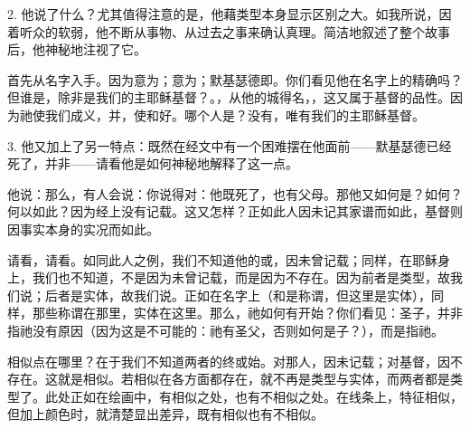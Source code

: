 2. 他说了什么？尤其值得注意的是，他藉类型本身显示区别之大。如我所说，因着听众的软弱，他不断从事物、从过去之事来确认真理。简洁地叙述了整个故事后，他神秘地注视了它。\par

首先从名字入手。因为意为；意为；默基瑟德即。你们看见他在名字上的精确吗？但谁是，除非是我们的主耶稣基督？。，从他的城得名，，这又属于基督的品性。因为祂使我们成义，并，使和好。哪个人是？没有，唯有我们的主耶稣基督。\par

3. 他又加上了另一特点：既然在经文中有一个困难摆在他面前——默基瑟德已经死了，并非——请看他是如何神秘地解释了这一点。\par

他说：那么，有人会说：你说得对：他既死了，也有父母。那他又如何是？如何？何以如此？因为经上没有记载。这又怎样？正如此人因未记其家谱而如此，基督则因事实本身的实况而如此。\par

请看，请看。如同此人之例，我们不知道他的或，因未曾记载；同样，在耶稣身上，我们也不知道，不是因为未曾记载，而是因为不存在。因为前者是类型，故我们说；后者是实体，故我们说。正如在名字上（和是称谓，但这里是实体），同样，那些称谓在那里，实体在这里。那么，祂如何有开始？你们看见：圣子，并非指祂没有原因（因为这是不可能的：祂有圣父，否则如何是子？），而是指祂。\par

相似点在哪里？在于我们不知道两者的终或始。对那人，因未记载；对基督，因不存在。这就是相似。若相似在各方面都存在，就不再是类型与实体，而两者都是类型了。此处正如在绘画中，有相似之处，也有不相似之处。在线条上，特征相似，但加上颜色时，就清楚显出差异，既有相似也有不相似。\par


